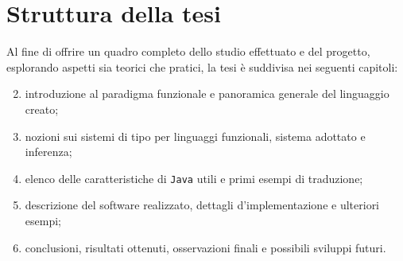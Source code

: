 \section{Struttura della tesi}
\label{sec:1-3-thesis-structure}

Al fine di offrire un quadro completo dello studio effettuato e del progetto,
esplorando aspetti sia teorici che pratici, la tesi è suddivisa nei seguenti capitoli:
\begin{enumerate}
    \setcounter{enumi}{1}
    \item introduzione al paradigma funzionale e panoramica generale del linguaggio creato;
    \item nozioni sui sistemi di tipo per linguaggi funzionali, sistema adottato e inferenza;
    \item elenco delle caratteristiche di \texttt{Java} utili e primi esempi di traduzione;
    \item descrizione del software realizzato, dettagli d'implementazione e ulteriori esempi;
    \item conclusioni, risultati ottenuti, osservazioni finali e possibili sviluppi futuri.
\end{enumerate}